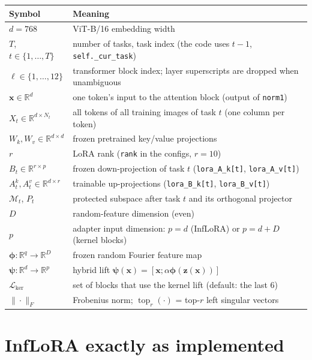 \documentclass[11pt]{article}
\theoremstyle{plain}
\theoremstyle{definition}
\theoremstyle{remark}
\newcommand{\R}{\mathbb{R}}
\newcommand{\M}{\mathcal{M}}
\newcommand{\Lk}{\mathcal{L}_{\mathrm{ker}}}
\newcommand{\topr}{\operatorname{top}_r}
\newcommand{\x}{\bm{x}}
\newcommand{\z}{\bm{z}}
\newcommand{\vphi}{\bm{\phi}}
\newcommand{\vpsi}{\bm{\psi}}
\newcommand{\code}[1]{\texttt{#1}}
\begin{document}
\begin{table}[h]
\centering
\small
\begin{tabular}{@{}ll@{}}
\toprule
Symbol & Meaning \\
\midrule
$d=768$ & ViT-B/16 embedding width \\
$T$, $t\in\{1,\dots,T\}$ & number of tasks, task index (the code uses $t-1$, \code{self.\_cur\_task}) \\
$\ell\in\{1,\dots,12\}$ & transformer block index; layer superscripts are dropped when unambiguous \\
$\x\in\R^{d}$ & one token's input to the attention block (output of \code{norm1}) \\
$X_t\in\R^{d\times N_t}$ & all tokens of all training images of task $t$ (one column per token) \\
$W_k,W_v\in\R^{d\times d}$ & frozen pretrained key/value projections \\
$r$ & LoRA rank (\code{rank} in the configs, $r=10$) \\
$B_t\in\R^{r\times p}$ & frozen down-projection of task $t$ (\code{lora\_A\_k[t]}, \code{lora\_A\_v[t]}) \\
$A^k_t,A^v_t\in\R^{d\times r}$ & trainable up-projections (\code{lora\_B\_k[t]}, \code{lora\_B\_v[t]}) \\
$\M_t$, $P_t$ & protected subspace after task $t$ and its orthogonal projector \\
$D$ & random-feature dimension (even) \\
$p$ & adapter input dimension: $p=d$ (InfLoRA) or $p=d+D$ (kernel blocks) \\
$\vphi:\R^{q}\to\R^{D}$ & frozen random Fourier feature map \\
$\vpsi:\R^{d}\to\R^{p}$ & hybrid lift $\vpsi(\x)=[\x;\alpha\vphi(\z(\x))]$ \\
$\Lk$ & set of blocks that use the kernel lift (default: the last 6) \\
$\|\cdot\|_F$ & Frobenius norm; $\topr(\cdot)$ = top-$r$ left singular vectors \\
\bottomrule
\end{tabular}
\end{table}

\section{InfLoRA exactly as implemented}\label{sec:inflora}
\end{document}
